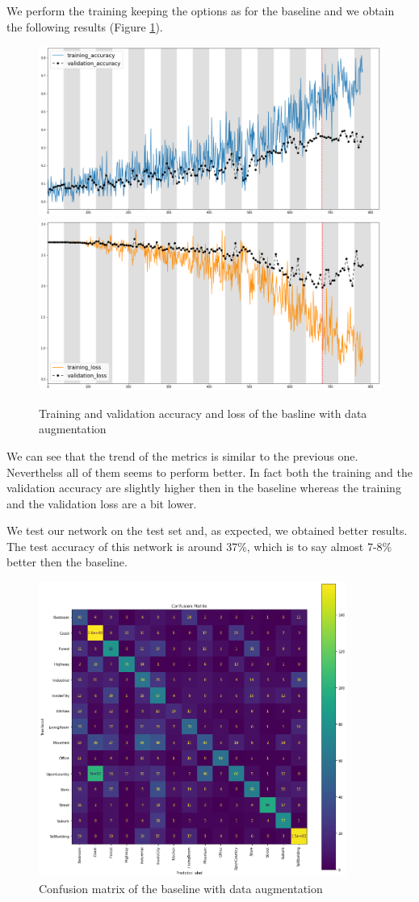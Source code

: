 \documentclass[12pt, a4paper]{report}
\begin{document}
We perform the training keeping the options as for the baseline and we obtain the following results (Figure \ref{fig:augmented}).

\begin{figure}[h!]
	\centering
	{\includegraphics[width=.49\textwidth]{img/aug_accuracy}}
	{\includegraphics[width=.49\textwidth]{img/aug_loss}}
	\caption{Training and validation accuracy and loss of the basline with data augmentation}
	\label{fig:augmented}
\end{figure}

We can see that the trend of the metrics is similar to the previous one. Neverthelss all of them seems to perform better. In fact both the training and the validation accuracy are slightly higher then in the baseline whereas the training and the validation loss are a bit lower. 

We test our network on the test set and, as expected, we obtained better results.\\
The test accuracy of this network is around 37\%, which is to say almost 7-8\% better then the baseline.

\begin{figure}[h!]
	\centering
	\includegraphics[width=0.9\textwidth]{img/aug_cmatrix}
	\caption{Confusion matrix of the baseline with data augmentation}
	\label{fig:augcmatrix}
\end{figure}
\end{document}
